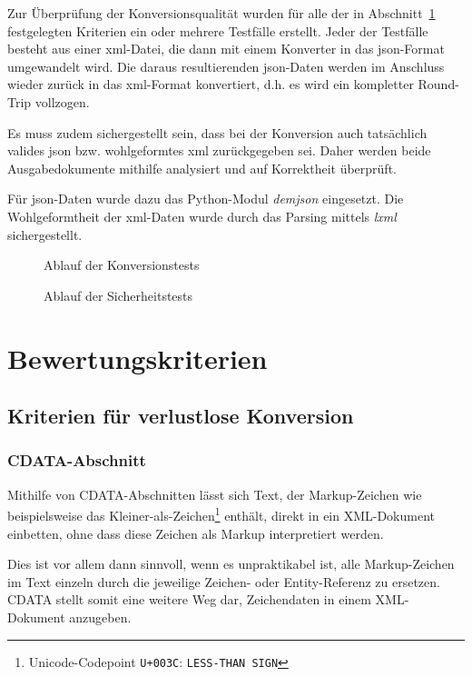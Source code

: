 Zur Überprüfung der Konversionsqualität wurden für alle der in Abschnitt~\ref{sec:criteria} festgelegten Kriterien ein oder mehrere Testfälle erstellt. Jeder der Testfälle besteht aus einer \acrshort{xml}-Datei, die dann mit einem Konverter in das \acrshort{json}-Format umgewandelt wird. Die daraus resultierenden \acrshort{json}-Daten werden im Anschluss wieder zurück in das \acrshort{xml}-Format konvertiert, d.h. es wird ein kompletter Round-Trip vollzogen.

Es muss zudem sichergestellt sein, dass bei der Konversion auch tatsächlich valides \acrshort{json} bzw. wohlgeformtes \acrshort{xml} zurückgegeben sei. Daher werden beide Ausgabedokumente mithilfe analysiert und auf Korrektheit überprüft.

Für \acrshort{json}-Daten wurde dazu das Python-Modul \emph{demjson} eingesetzt. Die Wohlgeformtheit der \acrshort{xml}-Daten wurde durch das Parsing mittels \emph{lxml} sichergestellt.

\begin{figure}
    
    \caption{Ablauf der Konversionstests}
\end{figure}

\begin{figure}
    
    \caption{Ablauf der Sicherheitstests}
\end{figure}

\section{Bewertungskriterien}
\label{sec:criteria}

\subsection{Kriterien für verlustlose Konversion}

\subsubsection{CDATA-Abschnitt}

Mithilfe von CDATA-Abschnitten lässt sich Text, der Markup-Zeichen wie beispielsweise das Kleiner-als-Zeichen\footnote{Unicode-Codepoint \texttt{U+003C}: \texttt{LESS-THAN SIGN}} enthält, direkt in ein XML-Dokument einbetten, ohne dass diese Zeichen als Markup interpretiert werden.

Dies ist vor allem dann sinnvoll, wenn es unpraktikabel ist, alle Markup-Zeichen im Text einzeln durch die jeweilige Zeichen- oder Entity-Referenz zu ersetzen. CDATA stellt somit eine weitere Weg dar, Zeichendaten in einem XML-Dokument anzugeben.\cite[Abschnitt~2.4]{maler2008xml}

